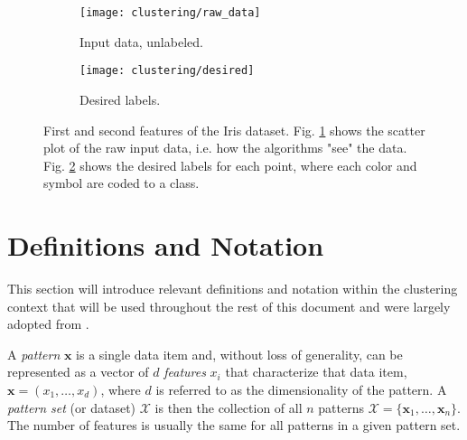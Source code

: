 
\begin{figure}[!ht]
    \centering
    \begin{subfigure}[b]{0.45\textwidth}
        \centering
        \texttt{[image: clustering/raw\_data]}
        \caption{Input data, unlabeled.}
        \label{fig:intro raw}
    \end{subfigure}
    \begin{subfigure}[b]{0.45\textwidth}
        \centering
        \texttt{[image: clustering/desired]}
        \caption{Desired labels.}
        \label{fig:intro natural}
    \end{subfigure}

    \caption{First and second features of the Iris dataset. Fig. \ref{fig:intro raw} shows the scatter plot of the raw input data, i.e. how the algorithms "see" the data. Fig. \ref{fig:intro natural} shows the desired labels for each point, where each color and symbol are coded to a class.}
    \label{fig:clustering plots}
\end{figure}


\section{Definitions and Notation}
\label{sec:definitions and notation}

This section will introduce relevant definitions and notation within the clustering context that will be used throughout the rest of this document and were largely adopted from \cite{Jain1999}.

A \emph{pattern} $\mathbf{x}$ is a single data item and, without loss of generality, can be represented as a vector of $d$ \emph{features} $x_i$ that characterize that data item, $\mathbf{x} = (x_1, \ldots, x_d)$, where $d$ is referred to as the dimensionality of the pattern.
A \emph{pattern set} (or dataset) $\mathcal{X}$ is then the collection of all $n$ patterns $\mathcal{X} = \{ \mathbf{x}_1, \ldots, \mathbf{x}_n \}$.
The number of features is usually the same for all patterns in a given pattern set.

